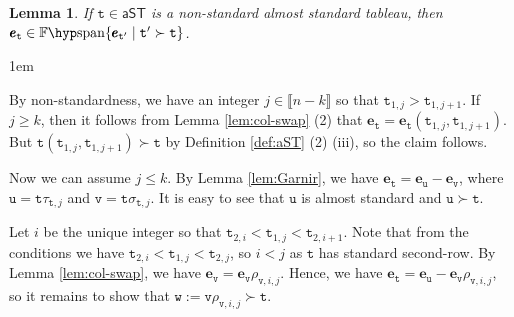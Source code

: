 \documentclass[a4paper]{amsart}
\makeatletter
\numberwithin{equation}{subsection}
\newtheorem{lemma}[theorem]{Lemma}
\theoremstyle{definition}
\newcommand{\interval}[1]{\llbracket #1 \rrbracket}
\newcommand{\bfe}{\pmb{e}}
\newcommand{\tbx}{\mathtt{t}}
\newcommand{\aST}{\mathsf{aST}}
\newcommand{\Fspan}{\mathbb{F}\hyp\mathrm{span}}
\renewenvironment{proof}[1][\proofname]{\par
	\pushQED{\qed}%
	\normalfont \topsep0\p@\@plus6\p@ \labelsep1em\relax
	\trivlist
	\item[\hskip\labelsep\bfseries #1]\ignorespaces
	\mbox{}%
}{
	\popQED\endtrivlist\@endpefalse
}
\numberwithin{equation}{subsection}
\makeatother
\begin{document}
\begin{lemma}\label{lem:nonstd}
If $\tbx\in \aST$ is a non-standard almost standard tableau, then $\bfe_{\tbx}\in \Fspan\{\bfe_{\tbx'}\mid \tbx'\succ \tbx\}$.
\end{lemma}
\begin{proof}
By non-standardness, we have an integer $j\in\interval{n-k}$ so that  $\tbx_{1,j}>\tbx_{1,j+1}$.
If $j\geq k$, then it follows from Lemma \ref{lem:col-swap} (2) that $\bfe_\tbx = \bfe_{\tbx}(\tbx_{1,j},\tbx_{1,j+1})$.
But $\tbx(\tbx_{1,j},\tbx_{1,j+1}) \succ \tbx$ by Definition \ref{def:aST} (2) (iii), so the claim follows.

Now we can assume $j\leq k$.
By Lemma \ref{lem:Garnir}, we have $\bfe_{\tbx} = \bfe_{\mathtt{u}}-\bfe_{\mathtt{v}}$, where $\mathtt{u}=\tbx\tau_{\tbx,j}$ and $\mathtt{v}=\tbx\sigma_{\tbx,j}$.
It is easy to see that $\mathtt{u}$ is almost standard and $\mathtt{u}\succ \tbx$.

Let $i$ be the unique integer so that $\tbx_{2,i} < \tbx_{1,j} < \tbx_{2,i+1}$.
Note that from the conditions we have $\tbx_{2,i}<\tbx_{1,j}<\tbx_{2,j}$, so $i<j$ as $\tbx$ has standard second-row.
By Lemma \ref{lem:col-swap}, we have $\bfe_{\mathtt{v}} = \bfe_{\mathtt{v}}\rho_{\mathtt{v},i,j}$.
Hence, we have $\bfe_{\tbx}=\bfe_{\mathtt{u}}-\bfe_{\mathtt{v}}\rho_{\mathtt{v},i,j}$, so it remains to show that $\mathtt{w}:=\mathtt{v}\rho_{\mathtt{v},i,j}\succ \tbx$.


\end{proof}
\end{document}
